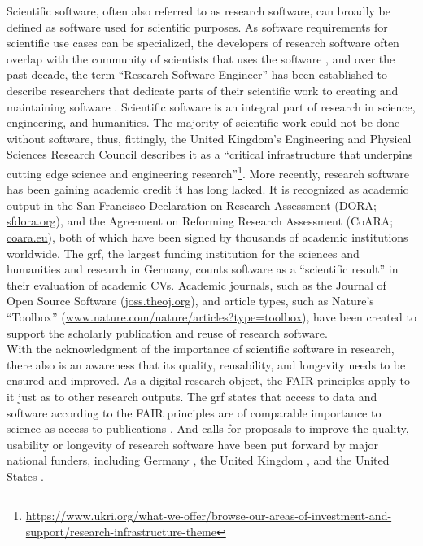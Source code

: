 Scientific software, often also referred to as research software, can broadly be defined as software used for scientific purposes.
As software requirements for scientific use cases can be specialized, the developers of research software often overlap with the community of scientists that uses the software \citep{hannay2009scientists}, and over the past decade, the term ``Research Software Engineer'' has been established to describe researchers that dedicate parts of their scientific work to creating and maintaining software \citep{hettrickRSE}.
Scientific software is an integral part of research in science, engineering, and humanities.
The majority of scientific work could not be done without software, thus, fittingly, the United Kingdom's Engineering and Physical Sciences Research Council describes it as a ``critical infrastructure that underpins cutting edge science and engineering research''\footnote{\url{https://www.ukri.org/what-we-offer/browse-our-areas-of-investment-and-support/research-infrastructure-theme}}.
More recently, research software has been gaining academic credit it has long lacked.
It is recognized as academic output in the San Francisco Declaration on Research Assessment (DORA; \href{https://sfdora.org/}{sfdora.org}), and the Agreement on Reforming Research Assessment (CoARA; \href{https://coara.eu}{coara.eu}), both of which have been signed by thousands of academic institutions worldwide. The \gls{grf}, the largest funding institution for the sciences and humanities and research in Germany, counts software as a ``scientific result'' in their evaluation of academic CVs.
Academic journals, such as the Journal of Open Source Software (\href{https://joss.theoj.org/}{joss.theoj.org}), and article types, such as Nature's ``Toolbox'' (\href{https://www.nature.com/nature/articles?type=toolbox}{www.nature.com/nature/articles?type=toolbox}), have been created to support the scholarly publication and reuse of research software.\\
With the acknowledgment of the importance of scientific software in research, there also is an awareness that its quality, reusability, and longevity needs to be ensured and improved.
As a digital research object, the \gls{FAIR} principles apply to it just as to other research outputs.
The \gls{grf} states that access to data and software according to the FAIR principles are of comparable importance to science as access to publications \citep{dfg}.
And calls for proposals to improve the quality, usability or longevity of research software have been put forward by major national funders, including Germany \citep[e.g.,][]{dfgrs}, the United Kingdom \citep[e.g.,][]{ukri}, and the United States \citep[e.g.,][]{nih}.\\
